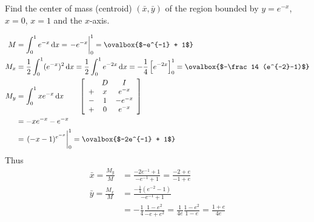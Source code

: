 \documentclass[12pt,answers]{exam}
\begin{document}
\begin{questions}
\newpage
\question[14] 
Find the center of mass (centroid) $(\bar x, \bar y)$ of the region bounded by $y=e^{-x}$, $x=0$, $x=1$ and the $x$-axis.
\begin{solution}
    \begin{align*}
    M &= \int_0^1 e^{-x} \dif x 
    = \eval{-e^{-x}}_0^1 
    = \ovalbox{$-e^{-1} + 1$} \\ 
    M_x &= \frac12 \int_0^1 (e^{-x})^2 \dif x
    = \frac 12 \int_0^1 e^{-2x} \dif x 
    = -\frac14 \left[e^{-2x}\right]_0^1
    = \ovalbox{$-\frac14 (e^{-2}-1)$} \\ 
    M_y &= \int_0^1 x e^{-x} \dif x \qquad 
    \left[
    \begin{array}{ccc}
        & D & I  \\ 
        + & x & e^{-x} \\ 
        - & 1 & -e^{-x} \\ 
        + & 0 & e^{-x}
    \end{array} 
    \right]
    \\
    &= -xe^{-x} - e^{-x}  \\
    &= \eval{(-x-1)^{e^{-x}}}_0^1 
    = \ovalbox{$-2e^{-1} + 1$}
    \end{align*}
    Thus
    \begin{align*}
        \bar x = \frac{M_y}{M} 
        &= \frac{-2e^{-1} + 1}{-e^{-1}+1} 
        = \boxed{\frac{-2+e}{-1+e}} \\ 
        \bar y = \frac{M_x}{M} 
        &= \frac{-\frac14 (e^{-2}-1)}{-e^{-1}+1} \\
        &= -\frac14 \frac{1-e^2}{-e+e^2}
        = \frac{1}{4e} \frac{1-e^2}{1-e}
        = \boxed{\frac{1+e}{4e}}
    \end{align*}
\end{solution}

\newpage
\question
{}
\end{questions}
\end{document}
